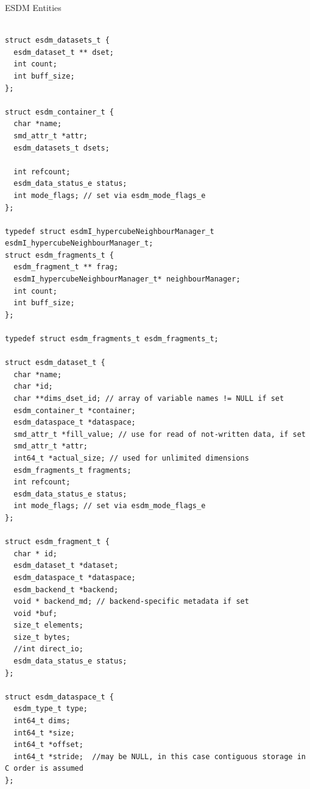 \begin{tcbcode}[label=esdm-entitites]{ESDM Entities}
\begin{lstlisting}[upquote=true]

struct esdm_datasets_t {
  esdm_dataset_t ** dset;
  int count;
  int buff_size;
};

struct esdm_container_t {
  char *name;
  smd_attr_t *attr;
  esdm_datasets_t dsets;

  int refcount;
  esdm_data_status_e status;
  int mode_flags; // set via esdm_mode_flags_e
};

typedef struct esdmI_hypercubeNeighbourManager_t esdmI_hypercubeNeighbourManager_t;
struct esdm_fragments_t {
  esdm_fragment_t ** frag;
  esdmI_hypercubeNeighbourManager_t* neighbourManager;
  int count;
  int buff_size;
};

typedef struct esdm_fragments_t esdm_fragments_t;

struct esdm_dataset_t {
  char *name;
  char *id;
  char **dims_dset_id; // array of variable names != NULL if set
  esdm_container_t *container;
  esdm_dataspace_t *dataspace;
  smd_attr_t *fill_value; // use for read of not-written data, if set
  smd_attr_t *attr;
  int64_t *actual_size; // used for unlimited dimensions
  esdm_fragments_t fragments;
  int refcount;
  esdm_data_status_e status;
  int mode_flags; // set via esdm_mode_flags_e
};

struct esdm_fragment_t {
  char * id;
  esdm_dataset_t *dataset;
  esdm_dataspace_t *dataspace;
  esdm_backend_t *backend;
  void * backend_md; // backend-specific metadata if set
  void *buf;
  size_t elements;
  size_t bytes;
  //int direct_io;
  esdm_data_status_e status;
};

struct esdm_dataspace_t {
  esdm_type_t type;
  int64_t dims;
  int64_t *size;
  int64_t *offset;
  int64_t *stride;  //may be NULL, in this case contiguous storage in C order is assumed
};

\end{lstlisting}
\end{tcbcode}

